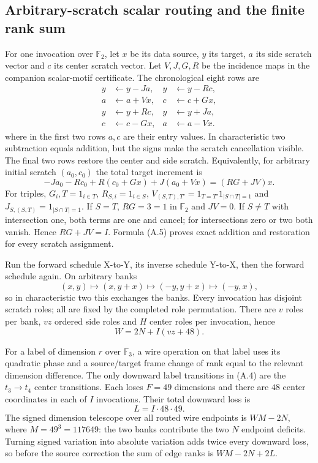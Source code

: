 \subsection{Arbitrary-scratch scalar routing and the finite rank sum}

For one invocation over $\mathbb F_2$, let $x$ be its data source, $y$
its target, $a$ its side scratch vector and $c$ its center scratch vector.
Let $V,J,G,R$ be the incidence maps in the companion scalar-motif
certificate. The chronological eight rows are
\[
\begin{aligned}
 y&\gets y-Ja, & y&\gets y-Rc,\\
 a&\gets a+Vx, & c&\gets c+Gx,\\
 y&\gets y+Rc, & y&\gets y+Ja,\\
 c&\gets c-Gx, & a&\gets a-Vx.
\end{aligned}
\]
where in the first two rows $a,c$ are their entry values. In
characteristic two subtraction equals addition, but the signs make the
scratch cancellation visible. The final two rows restore the center and
side scratch. Equivalently,
for arbitrary initial scratch $(a_0,c_0)$ the total target increment is
\[
 -Ja_0-Rc_0+R(c_0+Gx)+J(a_0+Vx)=(RG+JV)x.             \tag{A.5}
\]
For triples, $G_i,T=1_{i\in T}$, $R_{S,i}=1_{i\in S}$,
$V_{(S,T),T'}=1_{T=T'}1_{|S\cap T|=1}$ and
$J_{S,(S,T)}=1_{|S\cap T|=1}$. If $S=T$, $RG=3=1$ in $\mathbb F_2$
and $JV=0$. If $S\ne T$ with intersection one, both terms are one
and cancel; for intersections zero or two both vanish. Hence
$RG+JV=I$. Formula (A.5) proves exact addition and restoration for every
scratch assignment.

Run the forward schedule X-to-Y, its inverse schedule Y-to-X, then the
forward schedule again. On arbitrary banks
\[
 (x,y)\mapsto(x,y+x)\mapsto(-y,y+x)\mapsto(-y,x),
                                                               \tag{A.6}
\]
so in characteristic two this exchanges the banks. Every invocation has
disjoint scratch roles; all are fixed by the completed role permutation.
There are $v$ roles per bank, $vz$ ordered side roles and $H$ center
roles per invocation, hence
\[
 W=2N+I(vz+48).                                           \tag{A.7}
\]

For a label of dimension $r$ over $\mathbb F_3$, a wire operation on
that label uses its quadratic phase and a source/target frame change of
rank equal to the relevant dimension difference. The only downward
label transitions in (A.4) are the $t_3\to t_4$ center transitions.
Each loses $F=49$ dimensions and there are $48$ center coordinates in
each of $I$ invocations. Their total downward loss is
\[
 L=I\cdot48\cdot49.                                    \tag{A.8}
\]
The signed dimension telescope over all routed wire endpoints is
$WM-2N$, where $M=49^3=117649$: the two banks contribute the two $N$
endpoint deficits. Turning signed variation into absolute variation
adds twice every downward loss, so before the source correction the sum
of edge ranks is $WM-2N+2L$.


